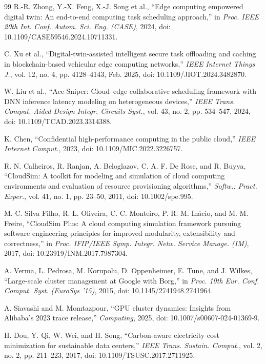 \documentclass[conference]{IEEEtran}
\begin{document}
\begin{thebibliography}{99}
 R.-R. Zhong, Y.-X. Feng, X.-J. Song et al., ``Edge computing empowered digital twin: An end-to-end computing task scheduling approach,'' in \textit{Proc. IEEE 20th Int. Conf. Autom. Sci. Eng. (CASE)}, 2024, doi: 10.1109/CASE59546.2024.10711331.

 C. Xu et al., ``Digital-twin-assisted intelligent secure task offloading and caching in blockchain-based vehicular edge computing networks,'' \textit{IEEE Internet Things J.}, vol. 12, no. 4, pp. 4128--4143, Feb. 2025, doi: 10.1109/JIOT.2024.3482870.

 W. Liu et al., ``Ace-Sniper: Cloud--edge collaborative scheduling framework with DNN inference latency modeling on heterogeneous devices,'' \textit{IEEE Trans. Comput.-Aided Design Integr. Circuits Syst.}, vol. 43, no. 2, pp. 534--547, 2024, doi: 10.1109/TCAD.2023.3314388.

 K. Chen, ``Confidential high-performance computing in the public cloud,'' \textit{IEEE Internet Comput.}, 2023, doi: 10.1109/MIC.2022.3226757.

 R. N. Calheiros, R. Ranjan, A. Beloglazov, C. A. F. De Rose, and R. Buyya, ``CloudSim: A toolkit for modeling and simulation of cloud computing environments and evaluation of resource provisioning algorithms,'' \textit{Softw.: Pract. Exper.}, vol. 41, no. 1, pp. 23--50, 2011, doi: 10.1002/spe.995.

 M. C. Silva Filho, R. L. Oliveira, C. C. Monteiro, P. R. M. In\'acio, and M. M. Freire, ``CloudSim Plus: A cloud computing simulation framework pursuing software engineering principles for improved modularity, extensibility and correctness,'' in \textit{Proc. IFIP/IEEE Symp. Integr. Netw. Service Manage. (IM)}, 2017, doi: 10.23919/INM.2017.7987304.

 A. Verma, L. Pedrosa, M. Korupolu, D. Oppenheimer, E. Tune, and J. Wilkes, ``Large-scale cluster management at Google with Borg,'' in \textit{Proc. 10th Eur. Conf. Comput. Syst. (EuroSys '15)}, 2015, doi: 10.1145/2741948.2741964.

 A. Siavashi and M. Momtazpour, ``GPU cluster dynamics: Insights from Alibaba's 2023 trace release,'' \textit{Computing}, 2025, doi: 10.1007/s00607-024-01369-9.

 H. Dou, Y. Qi, W. Wei, and H. Song, ``Carbon-aware electricity cost minimization for sustainable data centers,'' \textit{IEEE Trans. Sustain. Comput.}, vol. 2, no. 2, pp. 211--223, 2017, doi: 10.1109/TSUSC.2017.2711925.

\end{thebibliography}
\end{document}
